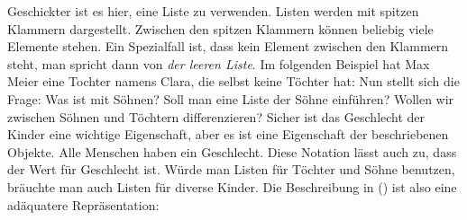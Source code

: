 Geschickter ist es hier, eine Liste zu verwenden. Listen werden mit spitzen
Klammern dargestellt. Zwischen den spitzen Klammern können beliebig
viele Elemente stehen. Ein Spezialfall ist, dass kein Element zwischen den
Klammern steht, man spricht dann von \emph{der leeren Liste}. Im folgenden Beispiel
hat Max Meier eine Tochter namens Clara, die selbst keine Töchter hat:
\ea
{}
\z
Nun stellt sich die Frage: Was ist mit Söhnen? Soll man eine Liste der Söhne einführen?
Wollen wir zwischen Söhnen und Töchtern differenzieren? 
Sicher ist das Geschlecht der Kinder eine wichtige Eigenschaft, aber es ist eine Eigenschaft
der beschriebenen Objekte. Alle Menschen haben ein Geschlecht. Diese Notation lässt auch zu, dass
der Wert für Geschlecht  ist. Würde man Listen für Töchter und Söhne benutzen, bräuchte
man auch Listen für diverse Kinder. Die Beschreibung in ()
ist also eine adäquatere Repräsentation:

